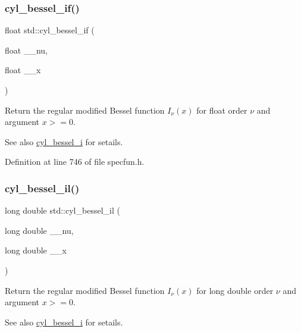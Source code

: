 \subsubsection{\texorpdfstring{cyl\+\_\+bessel\+\_\+if()}{cyl\_bessel\_if()}}
{\footnotesize\ttfamily float std\+::cyl\+\_\+bessel\+\_\+if (\begin{DoxyParamCaption}\item[{float}]{\+\_\+\+\_\+nu,  }\item[{float}]{\+\_\+\+\_\+x }\end{DoxyParamCaption})\hspace{0.3cm}{\ttfamily [inline]}}

Return the regular modified Bessel function $ I_{\nu}(x) $ for {\ttfamily float} order $ \nu $ and argument $ x >= 0 $.

\begin{DoxySeeAlso}{See also}
\hyperlink{group__cxx17__math__spec__func_ga29504b6008798072b0b8d6ea5a50ec60}{cyl\+\_\+bessel\+\_\+i} for setails. 
\end{DoxySeeAlso}


Definition at line 746 of file specfun.\+h.

\mbox{\label{group__cxx17__math__spec__func_gab7962629216d03efb8ecaa3f70c6878f}} 
\subsubsection{\texorpdfstring{cyl\+\_\+bessel\+\_\+il()}{cyl\_bessel\_il()}}
{\footnotesize\ttfamily long double std\+::cyl\+\_\+bessel\+\_\+il (\begin{DoxyParamCaption}\item[{long double}]{\+\_\+\+\_\+nu,  }\item[{long double}]{\+\_\+\+\_\+x }\end{DoxyParamCaption})\hspace{0.3cm}{\ttfamily [inline]}}

Return the regular modified Bessel function $ I_{\nu}(x) $ for {\ttfamily long double} order $ \nu $ and argument $ x >= 0 $.

\begin{DoxySeeAlso}{See also}
\hyperlink{group__cxx17__math__spec__func_ga29504b6008798072b0b8d6ea5a50ec60}{cyl\+\_\+bessel\+\_\+i} for setails. 
\end{DoxySeeAlso}


